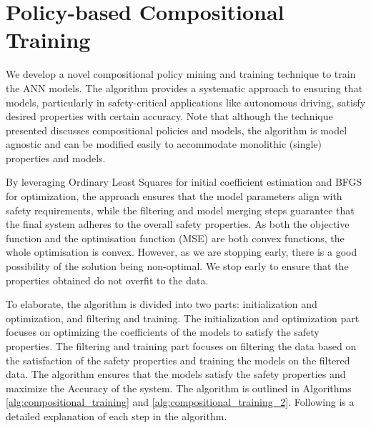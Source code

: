 \section{Policy-based Compositional Training}
\label{sec:av_compositional_training}

We develop a novel compositional policy mining and training technique to train the ANN models. The algorithm provides a systematic approach to ensuring that models, particularly in safety-critical applications like autonomous driving, satisfy desired properties with certain accuracy. Note that although the technique presented discusses compositional policies and models, the algorithm is model agnostic and can be modified easily to accommodate monolithic (single) properties and models. 

By leveraging Ordinary Least Squares for initial coefficient estimation and BFGS for optimization, the approach ensures that the model parameters align with safety requirements, while the filtering and model merging steps guarantee that~ the final system adheres to the overall safety properties. As both the objective function and the optimisation function (MSE) are both convex functions, the whole optimisation is convex. However, as we are stopping early, there is a good possibility of the solution being non-optimal. We stop early to ensure that the properties obtained do not overfit to the data.

To elaborate, the algorithm is divided into two parts: initialization and optimization, and filtering and training. The initialization and optimization part focuses on optimizing the coefficients of the models to satisfy the safety properties. The filtering and training part focuses on filtering the data based on the satisfaction of the safety properties and training the models on the filtered data. The algorithm ensures that the models satisfy the safety properties and maximize the Accuracy of the system. The algorithm is outlined in Algorithms \ref{alg:compositional_training} and \ref{alg:compositional_training_2}. Following is a detailed explanation of each step in the algorithm.


